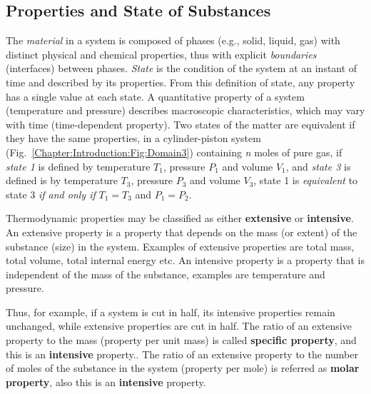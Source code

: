    \subsection{Properties and State of Substances}\label{Chapter:Introduction:Section:Introduction:ExtensiveIntensiveProperties}
   The {\it material} in a system is composed of phases (e.g., solid, liquid, gas) with distinct physical and chemical properties, thus with explicit {\it boundaries} (\ie interfaces) between phases. {\it State} is the condition of the system at an instant of time and described by its properties.  From this definition of state, any property has a single value at each state. A quantitative property of a system (\eg temperature and pressure) describes macroscopic characteristics, which may vary with time (\ie time-dependent property). Two states of the matter are equivalent if they have the same properties, \eg in a cylinder-piston system (Fig.~\ref{Chapter:Introduction:Fig:Domain3}) containing {\it n} moles of pure gas, if {\it state 1} is defined by temperature $T_{1}$, pressure $P_{1}$ and volume $V_{1}$, and {\it state 3} is defined is by temperature $T_{3}$, pressure $P_{3}$ and volume $V_{3}$, state 1 is {\it equivalent} to state 3 {\it if and only if} $T_{1} = T_{3}$ and $P_{1} = P_{2}$. 
\medskip

   Thermodynamic properties may be classified as either {\bf extensive} or {\bf intensive}. An extensive property is a property that depends on the mass (or extent) of the substance (\ie size) in the system. Examples of extensive properties are total mass, total volume, total internal energy etc. An intensive property is a property that is independent of the mass of the substance, examples are temperature and pressure.

   Thus, for example, if a system is cut in half, its intensive properties remain unchanged, while extensive properties are cut in half. The ratio of an extensive property to the mass (\ie property per unit mass) is called {\bf specific property}, and this is an {\bf intensive} property.. The ratio of an extensive property to the number of moles of the substance in the system (\ie property per mole) is referred as {\bf molar property}, also this is an {\bf intensive} property.

